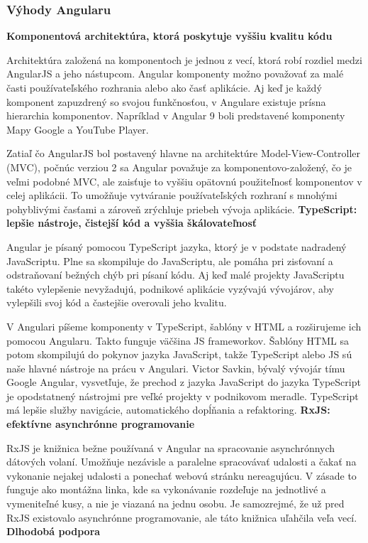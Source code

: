 \subsubsection{Výhody Angularu}
\textbf{Komponentová architektúra, ktorá poskytuje vyššiu kvalitu kódu}

\indent  Architektúra založená na komponentoch je jednou z vecí, ktorá robí rozdiel medzi AngularJS a jeho nástupcom. Angular komponenty možno považovať za malé časti používateľského rozhrania alebo ako časť aplikácie. Aj keď je každý komponent zapuzdrený so svojou funkčnosťou, v Angulare existuje prísna hierarchia komponentov. Napríklad v Angular 9 boli predstavené komponenty Mapy Google a YouTube Player.

\indent Zatiaľ čo AngularJS bol postavený hlavne na architektúre Model-View-Controller (MVC), počnúc verziou 2 sa Angular považuje za komponentovo-založený, čo je veľmi podobné MVC, ale zaisťuje to vyššiu opätovnú použiteľnosť komponentov v celej aplikácii. To umožňuje vytváranie používateľských rozhraní s mnohými pohyblivými časťami a zároveň zrýchluje priebeh vývoja aplikácie.  
\newline
\newline
\textbf{TypeScript: lepšie nástroje, čistejší kód a vyššia škálovateľnosť}

\indent Angular je písaný pomocou TypeScript jazyka, ktorý je v podstate nadradený JavaScriptu. Plne sa skompiluje do JavaScriptu, ale pomáha pri zisťovaní a odstraňovaní bežných chýb pri písaní kódu. Aj keď malé projekty JavaScriptu takéto vylepšenie nevyžadujú, podnikové aplikácie vyzývajú vývojárov, aby vylepšili svoj kód a častejšie overovali jeho kvalitu.

\indent V Angulari píšeme komponenty v TypeScript, šablóny v HTML a rozširujeme ich pomocou Angularu. Takto funguje väčšina JS frameworkov. Šablóny HTML sa potom skompilujú do pokynov jazyka JavaScript, takže TypeScript alebo JS sú naše hlavné nástroje na prácu v Angulari. Victor Savkin, bývalý vývojár tímu Google Angular, vysvetľuje, že prechod z jazyka JavaScript do jazyka TypeScript je opodstatnený nástrojmi pre veľké projekty v podnikovom meradle. TypeScript má lepšie služby navigácie, automatického dopĺňania a refaktoring.
\newline
\newline
\textbf{RxJS: efektívne asynchrónne programovanie}

\indent RxJS je knižnica bežne používaná v Angular na spracovanie asynchrónnych dátových volaní. Umožňuje nezávisle a paralelne spracovávať udalosti a čakať na vykonanie nejakej udalosti a ponechať webovú stránku nereagujúcu. V zásade to funguje ako montážna linka, kde sa vykonávanie rozdeľuje na jednotlivé a vymeniteľné kusy, a nie je viazaná na jednu osobu. Je samozrejmé, že už pred RxJS existovalo asynchrónne programovanie, ale táto knižnica uľahčila veľa vecí.
\newline
\newline
\textbf{Dlhodobá podpora}

